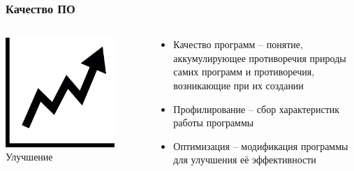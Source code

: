 \documentclass[10pt]{beamer}
\begin{document}

\begin{frame}[shrink=8]
\frametitle{Качество ПО}

\begin{columns}[c]

\begin{center}
  \includegraphics[width=0.8\textwidth]{res/img/improve.png}
  Улучшение
\end{center}

\begin{block}{}
\begin{itemize}
  \item Качество программ -- понятие, аккумулирующее противоречия природы самих программ и противоречия, возникающие при их создании
  \item Профилирование -- сбор характеристик работы программы
  \item Оптимизация -- модификация программы для улучшения её эффективности
\end{itemize}
\end{block}

\end{columns}


\end{frame}
\end{document}
